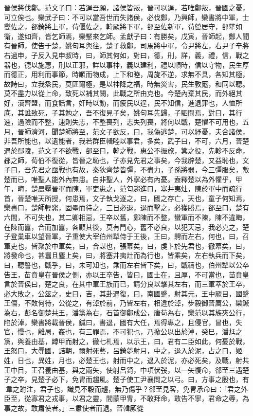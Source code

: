 \begin{pinyinscope}
晉侯將伐鄭。范文子曰：若逞吾願，諸侯皆叛，晉可以逞，若唯鄭叛，晉國之憂，可立俟也。欒武子曰：不可以當吾世而失諸侯，必伐鄭，乃興師，欒書將中軍，士燮佐之，郤錡將上軍，荀偃佐之，韓厥將下軍，郤至佐新軍，荀罃居守，郤犨如衛，遂如齊，皆乞師焉，欒黶來乞師。孟獻子曰：有勝矣，戊寅，晉師起，鄭人聞有晉師，使告于楚，姚句耳與往，楚子救鄭，司馬將中軍，令尹將左，右尹子辛將右過申，子反入見申叔時，曰，師其何如，對曰，德，刑，詳，義，禮，信，戰之器也，德以施惠，刑以正邪，詳以事神，義以建利，禮以順時，信以守物，民生厚而德正，用利而事節，時順而物成，上下和睦，周旋不逆，求無不具，各知其極，故詩曰，立我烝民，莫匪爾極，是以神降之福，時無災害，民生敦厖，和同以聽。莫不盡力以從上命，致死以補其闕，此戰之所由克也。今楚內棄其民，而外絕其好，瀆齊盟，而食話言，奸時以動，而疲民以逞，民不知信，進退罪也，人恤所底，其誰致死，子其勉之，吾不復見子矣，姚句耳先歸，子駟問焉，對曰，其行速，過險而不整，速則失志，不整喪列，志失列喪，將何以戰，楚懼不可用也，五月，晉師濟河，聞楚師將至，范文子欲反，曰，我偽逃楚，可以紓憂，夫合諸侯，非吾所能也，以遺能者，我若群臣輯睦以事君，多矣，武子曰，不可，六月，晉楚遇於鄢陵，范文子不欲戰，郤至曰，韓之戰，惠公不振旅，箕之役，先軫不反命，邲之師，荀伯不復從，皆晉之恥也，子亦見先君之事矣，今我辟楚，又益恥也，文子曰，吾先君之亟戰也有故，秦狄齊楚皆彊，不盡力，子孫將弱，今三彊服矣，敵楚而已，唯聖人能外內無患。自非聖人，外寧必有內憂。盍釋楚以為外懼乎，甲午，晦，楚晨壓晉軍而陳，軍吏患之，范匄趨進曰，塞井夷灶，陳於軍中而疏行首，晉楚唯天所授，何患焉，文子執戈逐之，曰，國之存亡，天也，童子何知焉，欒書曰，楚師輕窕，固壘而待之，三日必退，退而擊之，必獲勝焉，郤至曰，楚有六間，不可失也，其二卿相惡，王卒以舊，鄭陳而不整，蠻軍而不陳，陳不違晦，在陳而囂，合而加囂，各顧其後，莫有鬥心，舊不必良，以犯天忌，我必克之，楚子登巢車以望晉軍，子重使大宰伯州犁侍于王後，王曰，騁而左右，何也，曰，召軍吏也，皆聚於中軍矣，曰，合謀也，張幕矣，曰，虔卜於先君也，徹幕矣，曰，將發命也，甚囂且塵上矣，曰，將塞井夷灶而為行也，皆乘矣，左右執兵而下矣，曰，聽誓也，戰乎，曰，未可知也，乘而左右皆下矣，曰，戰禱也，伯州犁以公卒告王，苗賁皇在晉侯之側，亦以王卒告，皆曰，國士在，且厚，不可當也，苗賁皇言於晉侯曰，楚之良，在其中軍王族而已，請分良以擊其左右，而三軍萃於王卒，必大敗之，公筮之，史曰，吉，其卦遇復，曰，南國蹙，射其元，王中厥目，國蹙王傷，不敗何待，公從之，有淖於前，乃皆左右，相違於淖，步毅御晉厲公，欒鍼為右，彭名御楚共王，潘黨為右，石首御鄭成公，唐苟為右，欒范以其族夾公行，陷於淖，欒書將載晉侯，鍼曰，書退，國有大任，焉得專之，且侵官，冒也，失官，慢也，離局，姦也，有三罪焉，不可犯也，乃掀公以出於淖，癸巳，潘尪之黨，與養由基，蹲甲而射之，徹七札焉，以示王，曰，君有二臣如此，何憂於戰，王怒曰，大辱國，詰朝，爾射死藝，呂錡夢射月，中之，退入於泥，占之曰，姬姓，日也，異姓，月也，必楚王也，射而中之，退入於泥，亦必死矣，及戰，射共王中目，王召養由基，與之兩矢，使射呂錡，中項伏弢，以一矢復命，郤至三遇楚子之卒，見楚子必下，免冑而趨風。楚子使工尹襄問之以弓。曰，方事之殷也，有𩎟韋之跗注，君子也，識見不穀而趨，無乃傷乎？郤至見客，免冑承命曰：「君之外臣至，從寡君之戎事，以君之靈，間蒙甲冑，不敢拜命，敢告不寧，君命之辱，為事之故，敢肅使者。」三肅使者而退。晉韓厥從
\end{pinyinscope}
